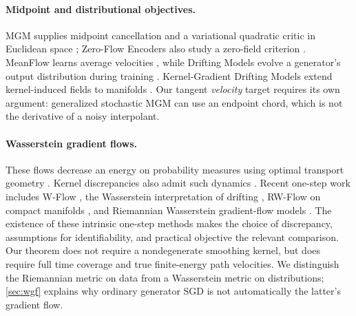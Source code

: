 \paragraph{Midpoint and distributional objectives.}
MGM supplies midpoint cancellation and a variational quadratic critic in Euclidean space \citep{shlenskii2026midpoint}; Zero-Flow Encoders also study a zero-field criterion \citep{wang2026zeroflow}. MeanFlow learns average velocities \citep{geng2025mean}, while Drifting Models evolve a generator's output distribution during training \citep{deng2026drifting}. Kernel-Gradient Drifting Models extend kernel-induced fields to manifolds \citep{estebancasadevall2026kgdm}. Our tangent \emph{velocity} target requires its own argument: generalized stochastic MGM can use an endpoint chord, which is not the derivative of a noisy interpolant.

\paragraph{Wasserstein gradient flows.}
These flows decrease an energy on probability measures using optimal transport geometry \citep{jordan1998variational,ambrosio2008gradient}. Kernel discrepancies also admit such dynamics \citep{arbel2019maximum}. Recent one-step work includes W-Flow \citep{han2026wflow}, the Wasserstein interpretation of drifting \citep{gretton2026wasserstein}, RW-Flow on compact manifolds \citep{nurgulan2026rwflow}, and Riemannian Wasserstein gradient-flow models \citep{li2026rwgf}. The existence of these intrinsic one-step methods makes the choice of discrepancy, assumptions for identifiability, and practical objective the relevant comparison. Our theorem does not require a nondegenerate smoothing kernel, but does require full time coverage and true finite-energy path velocities. We distinguish the Riemannian metric on data from a Wasserstein metric on distributions; \cref{sec:wgf} explains why ordinary generator SGD is not automatically the latter's gradient flow.
